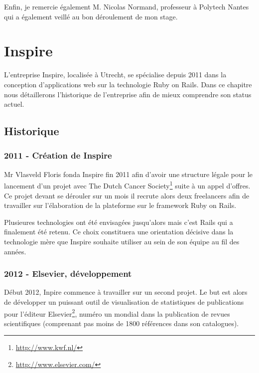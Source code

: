 \documentclass[12pt,a4paper]{book}
\begin{document}

Enfin, je remercie également M. Nicolas Normand, professeur à Polytech Nantes qui a également veillé au bon déroulement de mon stage.


\chapter{Inspire}

L'entreprise Inspire, localisée à Utrecht, se spécialise depuis 2011 dans la conception d'applications web sur la technologie Ruby on Rails. Dans ce chapitre nous détaillerons l'historique de l'entreprise afin de mieux comprendre son status actuel.

\section{Historique}
\subsection{2011 - Création de Inspire}

Mr Vlasveld Floris fonda Inspire fin 2011 afin d'avoir une structure légale pour le lancement d'un projet avec The Dutch Cancer Society\footnote{\url{http://www.kwf.nl/}} suite à un appel d'offres. Ce projet devant se dérouler sur un mois il recrute alors deux freelancers afin de travailler sur l'élaboration de la plateforme sur le framework Ruby on Rails.

Plusieures technologies ont été envisagées jusqu'alors mais c'est Rails qui a finalement été retenu. Ce choix constituera une orientation décisive dans la technologie mère que Inspire souhaite utiliser au sein de son équipe au fil des années.

\subsection{2012 - Elsevier, développement}

Début 2012, Inpire commence à travailler sur un second projet. Le but est alors de développer un puissant outil de visualisation de statistiques de publications pour l'éditeur Elsevier\footnote{\url{http://www.elsevier.com/}}, numéro un mondial dans la publication de revues scientifiques (comprenant pas moins de 1800 références dans son catalogues).
\end{document}
